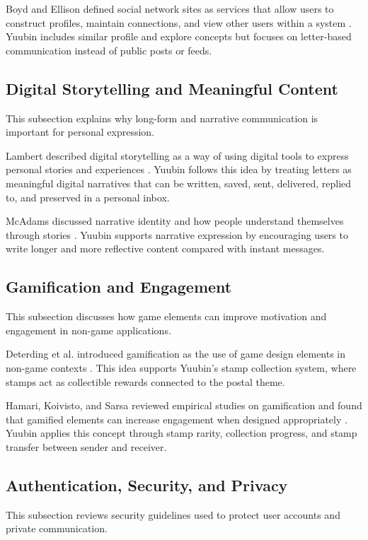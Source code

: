﻿\documentclass[12pt,a4paper]{report}
\begin{document}
Boyd and Ellison defined social network sites as services that allow users to construct profiles, maintain connections, and view other users within a system \cite{boyd2007sns}. Yuubin includes similar profile and explore concepts but focuses on letter-based communication instead of public posts or feeds.

\subsection{Digital Storytelling and Meaningful Content}
This subsection explains why long-form and narrative communication is important for personal expression.

Lambert described digital storytelling as a way of using digital tools to express personal stories and experiences \cite{lambert2013digitalstorytelling}. Yuubin follows this idea by treating letters as meaningful digital narratives that can be written, saved, sent, delivered, replied to, and preserved in a personal inbox.

McAdams discussed narrative identity and how people understand themselves through stories \cite{mcadams2001narrative}. Yuubin supports narrative expression by encouraging users to write longer and more reflective content compared with instant messages.

\subsection{Gamification and Engagement}
This subsection discusses how game elements can improve motivation and engagement in non-game applications.

Deterding et al. introduced gamification as the use of game design elements in non-game contexts \cite{deterding2011gamification}. This idea supports Yuubin's stamp collection system, where stamps act as collectible rewards connected to the postal theme.

Hamari, Koivisto, and Sarsa reviewed empirical studies on gamification and found that gamified elements can increase engagement when designed appropriately \cite{hamari2014gamification}. Yuubin applies this concept through stamp rarity, collection progress, and stamp transfer between sender and receiver.

\subsection{Authentication, Security, and Privacy}
This subsection reviews security guidelines used to protect user accounts and private communication.
\end{document}
